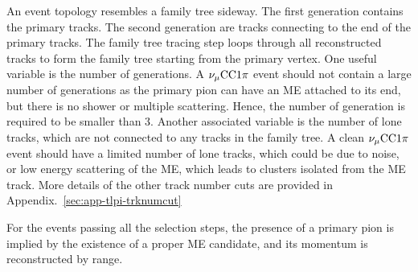            An event topology resembles a family tree sideway. 
            The first generation contains the primary tracks.
            The second generation are tracks connecting to the end of the primary tracks.
            The family tree tracing step loops through all reconstructed tracks to form the family tree starting from the primary vertex.
            One useful variable is the number of generations.
            A $\nu_{\mu}\textrm{CC}1\pi$ event should not contain a large number of generations as the primary pion can have an ME attached to its end, but there is no shower or multiple scattering.
            Hence, the number of generation is required to be smaller than $3$.
            Another associated variable is the number of lone tracks, which are not connected to any tracks in the family tree. 
            A clean $\nu_{\mu}\textrm{CC}1\pi$ event should have a limited number of lone tracks, which could be due to noise, or low energy scattering of the ME, which leads to clusters isolated from the ME track. 
            More details of the other track number cuts are provided in Appendix.~\ref{sec:app-tlpi-trknumcut}
        
            For the events passing all the selection steps, the presence of a primary pion is implied by the existence of a proper ME candidate, and its momentum is reconstructed by range. 


